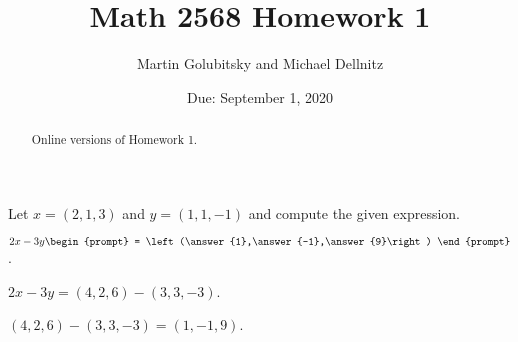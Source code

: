 \documentclass{ximera}
\date{Due: September 1, 2020}
\title{Math 2568 Homework 1}
\author{Martin Golubitsky and Michael Dellnitz}
\begin{document}
\begin{abstract}
Online versions of Homework 1.
\end{abstract}
\maketitle


\problemlabel

\noindent Let $x=(2,1,3)$ and  $y=(1,1,-1)$ and compute the given expression.

\begin{exercise}  \label{c1.1.1B}
  $2x-3y\begin{prompt}
    = \left(\answer{1},\answer{-1},\answer{9}\right)
  \end{prompt}$.
  \begin{hint}
    $2x - 3y = (4,2,6) - (3,3,-3)$.
  \end{hint}
  \begin{hint}
    $(4,2,6) - (3,3,-3) = (1,-1,9)$.
  \end{hint}  

%
\end{exercise}





\problemlabel
\end{document}
